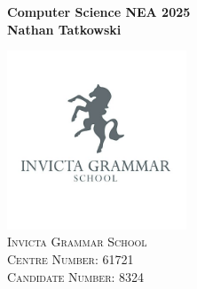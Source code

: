 \begin{titlepage}
    \begin{center}
        \vspace*{1cm}
        \Huge
        \textbf{Computer Science NEA 2025} \\
        \vspace*{2cm}
        \LARGE
        \textbf{Nathan Tatkowski}

        \vfill
        \includegraphics*[width=0.4\textwidth]{figures/igsLogo.jpg} \\
        \Large
        \textsc{Invicta Grammar School} \\
        \textsc{Centre Number: 61721} \\
        \textsc{Candidate Number: 8324}
    \end{center}
\end{titlepage}